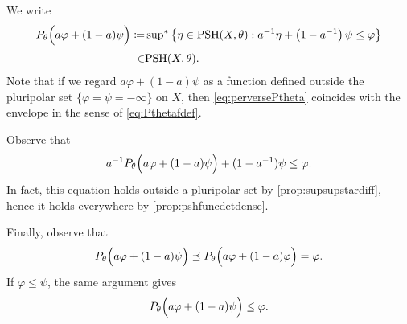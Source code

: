 We write
\begin{equation}\label{eq:perversePtheta}
    \begin{aligned}
    P_{\theta}\Bigl(a\varphi+(1-a)\psi\Bigr)\coloneqq  &\operatorname*{sup}_{}{}\!{}^{*}\left\{\eta\in \mathrm{PSH}(X,\theta): a^{-1}\eta+\left(1-a^{-1}\right)\psi  \leq  \varphi \right\}\\
    \in & \mathrm{PSH}(X,\theta).
    \end{aligned}
\end{equation}
Note that if we regard $a\varphi+(1-a)\psi$ as a function defined outside the pluripolar set $\{\varphi=\psi=-\infty\}$ on $X$, then \eqref{eq:perversePtheta} coincides with the envelope in the sense of \eqref{eq:Pthetafdef}.

Observe that
\begin{equation}\label{eq:P_path_everywhere_ineq}
a^{-1}P_{\theta}\Bigl(a\varphi+(1-a)\psi \Bigr)+(1-a^{-1})\psi\leq \varphi.
\end{equation}
In fact, this equation holds outside a pluripolar set by \cref{prop:supsupstardiff}, hence it holds everywhere by \cref{prop:pshfuncdetdense}.

Finally, observe that
\[
P_{\theta}\Bigl(a\varphi+(1-a)\psi\Bigr)\preceq P_{\theta}\Bigl(a\varphi+(1-a)\varphi\Bigr)=\varphi.
\]
If $\varphi\leq \psi$, the same argument gives
\[
P_{\theta}\Bigl(a\varphi+(1-a)\psi\Bigr)\leq\varphi.
\]


